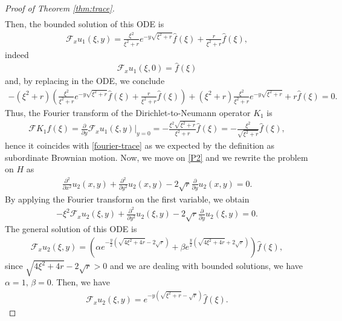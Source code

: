 \documentclass[11pt,a4paper]{article}
\theoremstyle{definition}
\theoremstyle{remark}
\begin{document}
\begin{proof}[Proof of Theorem \ref{thm:trace}]
\begin{align*}
		\end{align*}
		Then, the bounded solution of this ODE is
		\begin{align}
			\label{ODE-resetting}
			\mathcal{F}_x u_1(\xi,y) = \frac{\xi^2}{\xi^2 + r} e^{-y\sqrt{\xi^2 + r} } \widehat{f}(\xi) + \frac{r}{\xi^2+r} \widehat{f}(\xi),
		\end{align}
		indeed 
		\begin{align*}
			\mathcal{F}_x u_1(\xi,0)= \widehat{f}(\xi)
		\end{align*}
		and, by replacing in the ODE, we conclude
		\begin{align*}
			- (\xi^2 + r) \left(\frac{\xi^2}{\xi^2 + r} e^{-y\sqrt{\xi^2 + r} } \widehat{f}(\xi) + \frac{r}{\xi^2+r} \widehat{f}(\xi)\right) + (\xi^2+r) \frac{\xi^2}{\xi^2 + r} e^{-y\sqrt{\xi^2 + r} } + r \widehat{f}(\xi)=0.
		\end{align*}
		Thus, the Fourier transform of the Dirichlet-to-Neumann operator $K_1$ is
		\begin{align*}
			\mathcal{F} K_1 f(\xi)= \frac{\partial}{\partial y} \mathcal{F}_x u_1(\xi,y) \big\vert_{y=0}= -\frac{\xi^2 \sqrt{\xi^2 + r}}{\xi^2 + r} \widehat{f}(\xi)=- \frac{\xi^2}{\sqrt{\xi^2 + r}} \widehat{f}(\xi),
		\end{align*}
		hence it coincides with \eqref{fourier-trace} as we expected by the definition as subordinate Brownian motion. Now, we move on \eqref{P2} and we rewrite the problem on \(H\) as
		\begin{align*}
			\frac{\partial^2}{\partial x^2} u_2(x,y) + \frac{\partial^2}{\partial y^2} u_2(x,y) - 2 \sqrt{r} \frac{\partial}{\partial y} u_2(x,y)=0.
		\end{align*}
		By applying the Fourier transform on the first variable, we obtain
		\begin{align*}
			- \xi^2 \mathcal{F}_x u_2(\xi, y) + \frac{\partial^2}{\partial y^2} u_2(\xi,y) - 2 \sqrt{r} \frac{\partial}{\partial y} u_2(\xi,y)=0.
		\end{align*}
		The general solution of this ODE is
		\begin{align*}
			\mathcal{F}_x u_2(\xi, y)= (\alpha e^{-\frac{y}{2}(\sqrt{4 \xi^2 + 4r} - 2\sqrt{r})} + \beta e^{\frac{y}{2}(\sqrt{4 \xi^2 + 4r} + 2\sqrt{r})}) \widehat{f}(\xi),
		\end{align*}
		since $\sqrt{4 \xi^2 + 4r} - 2\sqrt{r}>0$ and we are dealing with bounded solutions, we have $\alpha=1, \, \beta=0$. Then, we have
		\begin{align*}
			\mathcal{F}_x u_2(\xi,y)= e^{-y (\sqrt{\xi^2 +r} - \sqrt{r})} \widehat{f}(\xi). 

\end{align*}
\end{proof}
\end{document}
